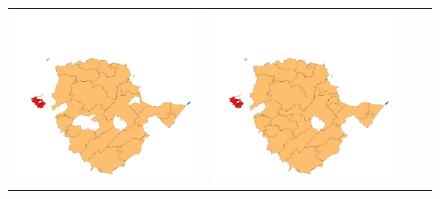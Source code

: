 \begin{figure}
\begin{tabularx}{1\textwidth}{XXXX}
\includegraphics[width=1\linewidth]{images/ch6/contig/17}&
\includegraphics[width=1\linewidth]{images/ch6/contig/18}&

\end{tabularx}
\end{figure}
